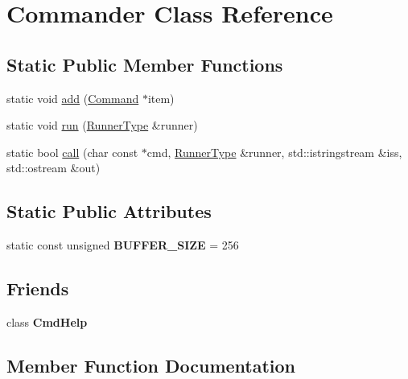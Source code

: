\hypertarget{classCommander}{}\section{Commander Class Reference}
\label{classCommander}
\subsection*{Static Public Member Functions}
\begin{DoxyCompactItemize}
\item 
static void \hyperlink{classCommander_a467f6a4ceeb5dab750cf3f4821b5db90}{add} (\hyperlink{classCommand}{Command} $\ast$item)
\item 
static void \hyperlink{classCommander_afea1bfe2bc8dbeea0d0523f369c9539e}{run} (\hyperlink{classProgram}{Runner\+Type} \&runner)
\item 
static bool \hyperlink{classCommander_a28323e9560f01aba51869d54832ca987}{call} (char const $\ast$cmd, \hyperlink{classProgram}{Runner\+Type} \&runner, std\+::istringstream \&iss, std\+::ostream \&out)
\end{DoxyCompactItemize}
\subsection*{Static Public Attributes}
\begin{DoxyCompactItemize}
\item 
\mbox{\label{classCommander_a9e1b32d844b2d8080e51c4e8a4ca0442}} 
static const unsigned {\bfseries B\+U\+F\+F\+E\+R\+\_\+\+S\+I\+ZE} = 256
\end{DoxyCompactItemize}
\subsection*{Friends}
\begin{DoxyCompactItemize}
\item 
\mbox{\label{classCommander_aaf5700242631ebac67a8b2f6eaf9c730}} 
class {\bfseries Cmd\+Help}
\end{DoxyCompactItemize}


\subsection{Member Function Documentation}
\mbox{\label{classCommander_a467f6a4ceeb5dab750cf3f4821b5db90}} 
